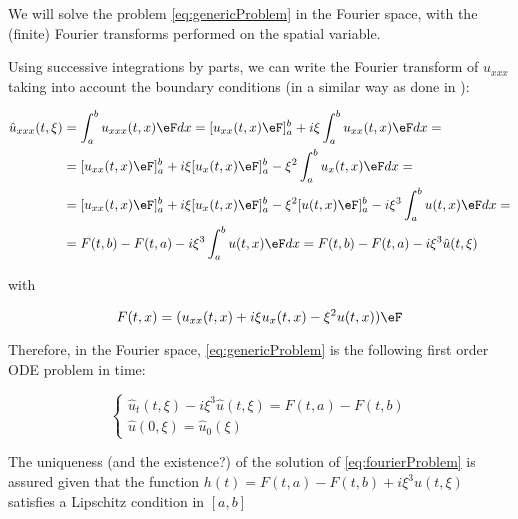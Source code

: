 \indent We will solve the problem \eqref{eq:genericProblem} in the Fourier space, with the (finite) Fourier transforms performed on the spatial variable.

\indent Using successive integrations by parts, we can write the Fourier transform of $u_{xxx}$ taking into account the boundary conditions (in a similar way as done in \cite{finiteFourier}):



\begin{equation*}
	\begin{aligned}
		\hat{u}_{xxx}(t,\xi) & = \int_a^b{u_{xxx}(t,x) \eF dx} = [u_{xx}(t,x) \eF]_a^b + i\xi \int_a^b{u_{xx}(t,x) \eF dx} = \\
										 & =  [u_{xx}(t,x) \eF]_a^b + i \xi [u_{x}(t,x) \eF]_a^b - \xi^2 \int_a^b{u_{x}(t,x) \eF dx} = \\
										 & = [u_{xx}(t,x) \eF]_a^b + i \xi [u_{x}(t,x) \eF]_a^b - \xi^2 [u(t,x) \eF]_a^b - i\xi^3 \int_a^b{u(t,x) \eF dx} = \\
										 & = F(t,b) - F(t,a) - i\xi^3 \int_a^b{u(t,x) \eF dx} = F(t,b) - F(t,a) - i\xi^3 \hat{u}(t,\xi)
	\end{aligned} 
\end{equation*}

\noindent with

\begin{equation*}
	F(t,x) =(u_{xx}(t,x) + i \xi u_{x}(t,x) - \xi^2 u(t,x)) \eF 
\end{equation*}

\indent Therefore, in the Fourier space, \eqref{eq:genericProblem} is the following first order ODE problem in time:

\begin{equation}
	\label{eq:fourierProblem}
	\begin{cases}
		\hat{u}_t(t,\xi) - i\xi^3 \hat{u}(t,\xi) = F(t,a)-F(t,b) \\
		\hat{u}(0,\xi) = \hat{u}_0(\xi)
	\end{cases}
\end{equation}

\indent The uniqueness (and the existence?) of the solution of \eqref{eq:fourierProblem} is assured given that the function $h(t) = F(t,a)-F(t,b) + i\xi^3 \hat{u}(t,\xi)$ satisfies a Lipschitz condition in $[a,b]$ \cite[theorem 1.2.1]{odeUniqueness} 